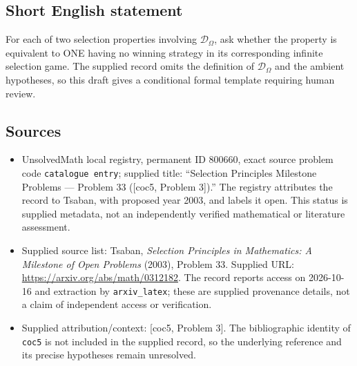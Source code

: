 \documentclass[11pt]{article}
\begin{document}
\subsection{Short English statement}
For each of two selection properties involving \(\mathcal D_\Omega\), ask whether the property is equivalent to ONE having no winning strategy in its corresponding infinite selection game. The supplied record omits the definition of \(\mathcal D_\Omega\) and the ambient hypotheses, so this draft gives a conditional formal template requiring human review.
\subsection{Sources}
\begin{itemize}
\item UnsolvedMath local registry, permanent ID \(800660\), exact source problem code \texttt{catalogue entry}; supplied title: ``Selection Principles Milestone Problems --- Problem 33 ([coc5, Problem 3]).'' The registry attributes the record to Tsaban, with proposed year 2003, and labels it open. This status is supplied metadata, not an independently verified mathematical or literature assessment.
\item Supplied source list: Tsaban, \emph{Selection Principles in Mathematics: A Milestone of Open Problems} (2003), Problem 33. Supplied URL: \url{https://arxiv.org/abs/math/0312182}. The record reports access on 2026-10-16 and extraction by \texttt{arxiv\_latex}; these are supplied provenance details, not a claim of independent access or verification.
\item Supplied attribution/context: [coc5, Problem 3]. The bibliographic identity of \texttt{coc5} is not included in the supplied record, so the underlying reference and its precise hypotheses remain unresolved.
\end{itemize}
\end{document}
